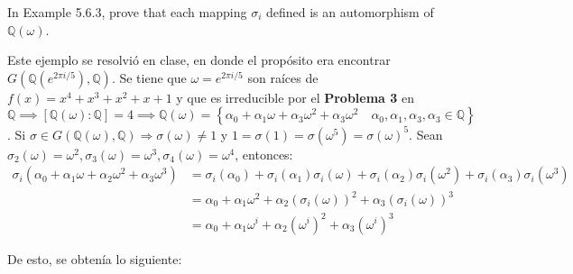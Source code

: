 \begin{problema}[Problema 4]
    In Example 5.6.3, prove that each mapping $\sigma_i$ defined is an automorphism of $\mathbb{Q}(\omega)$.
    \begin{dem}
        Este ejemplo se resolvió en clase, en donde el propósito era encontrar $G(\mathbb{Q}(e^{2\pi i/5}),\mathbb{Q})$. Se tiene que $\omega =e^{2\pi i/5}$ son raíces de $f(x)=x^4+x^3+x^2+x+1$ y que es irreducible por el \textbf{Problema 3} en $\mathbb{Q}\implies [\mathbb{Q}(\omega):\mathbb{Q}]=4\implies\mathbb{Q}(\omega)=\left\{\alpha_0+\alpha_1 \omega+\alpha_3 \omega^2+\alpha_3 \omega^2 \quad \alpha_0, \alpha_1, \alpha_3, \alpha_3 \in \mathbb{Q}\right\}$. Si $\sigma \in G(\mathbb{Q}(\omega), \mathbb{Q}) \Rightarrow \sigma(\omega) \neq 1$ y $ 1=\sigma(1)=\sigma\left(\omega^5\right)=\sigma(\omega)^5$. Sean  $\sigma_2(\omega)=\omega^2, \sigma_3(\omega)=\omega^3, \sigma_4(\omega)=\omega^4$, entonces:
        \begin{align*}
            \sigma_i\left(\alpha_0+\alpha_1 \omega+\alpha_2 \omega^2+\alpha_3 \omega^3\right)&=\sigma_i\left(\alpha_0\right)+\sigma_i\left(\alpha_1\right) \sigma_i(\omega)+\sigma_i\left(\alpha_2\right) \sigma_i\left(\omega^2\right)+\sigma_i\left(\alpha_3\right) \sigma_i\left(\omega^3\right)\\
            &=\alpha_0+\alpha_1 \omega^2+\alpha_2\left(\sigma_i(\omega)\right)^2+\alpha_3\left(\sigma_i(\omega)\right)^3\\
            &= \alpha_0+\alpha_1\omega^i + \alpha_2(\omega^i)^2+\alpha_3(\omega^i)^3
        \end{align*}
         
        De esto, se obtenía lo siguiente: 


\end{dem}
\end{problema}
